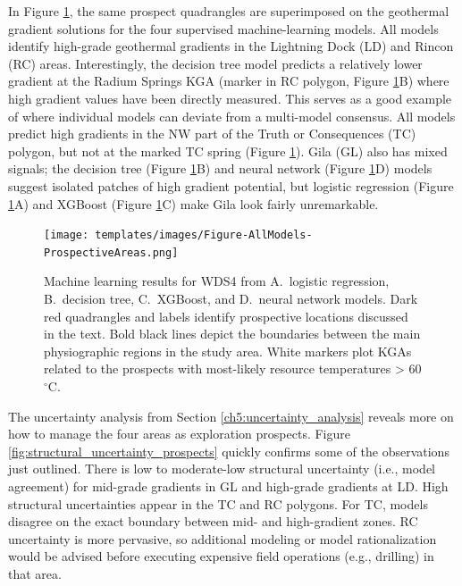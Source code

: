 In Figure \ref{fig:ml_models_prospects}, the same prospect quadrangles are superimposed on the geothermal gradient solutions for the four supervised machine-learning models. All models identify high-grade geothermal gradients in the Lightning Dock (LD) and Rincon (RC) areas. Interestingly, the decision tree model predicts a relatively lower gradient at the Radium Springs KGA (marker in RC polygon, Figure \ref{fig:ml_models_prospects}B) where high gradient values have been  directly measured. This serves as a good example of where individual models can deviate from a multi-model consensus. All models predict high gradients in the NW part of the Truth or Consequences (TC) polygon, but not at the marked TC spring (Figure \ref{fig:ml_models_prospects}). Gila (GL) also has mixed signals; the decision tree (Figure \ref{fig:ml_models_prospects}B) and neural network (Figure \ref{fig:ml_models_prospects}D) models suggest isolated patches of high gradient potential, but logistic regression (Figure \ref{fig:ml_models_prospects}A) and XGBoost (Figure \ref{fig:ml_models_prospects}C) make Gila look fairly unremarkable.

\begin{figure}
\centering
\texttt{[image: templates/images/Figure-AllModels-ProspectiveAreas.png]}
\caption[Machine learning models with prospective areas]
{Machine learning results for WDS4 from A.\ logistic regression, B.\ decision tree, C.\ XGBoost, and D.\ neural network models. Dark red quadrangles and labels identify prospective locations discussed in the text. Bold black lines depict the boundaries between the main physiographic regions in the study area. White markers plot KGAs related to the prospects with most-likely resource temperatures > 60 $^\circ$C.}
\label{fig:ml_models_prospects}
\end{figure}

The uncertainty analysis from Section \ref{ch5:uncertainty_analysis} reveals more on how to manage the four areas as exploration prospects. Figure \ref{fig:structural_uncertainty_prospects} quickly confirms some of the observations just outlined. There is low to moderate-low structural uncertainty (i.e., model agreement) for mid-grade gradients in GL and high-grade gradients at LD. High structural uncertainties appear in the TC and RC polygons. For TC, models disagree on the exact boundary between mid- and high-gradient zones. RC uncertainty is more pervasive, so additional modeling or model rationalization would be advised before executing expensive field operations (e.g., drilling) in that area.

